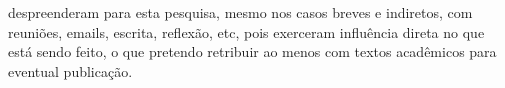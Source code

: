 \documentclass[a4paper, 11pt]{article} %
\begin{document}
despreenderam para esta pesquisa, mesmo nos casos breves e indiretos, com reuniões, emails, escrita, reflexão, etc, pois exerceram influência direta no que está sendo feito, o que pretendo retribuir ao menos com textos acadêmicos para eventual publicação.

%



\end{document}
